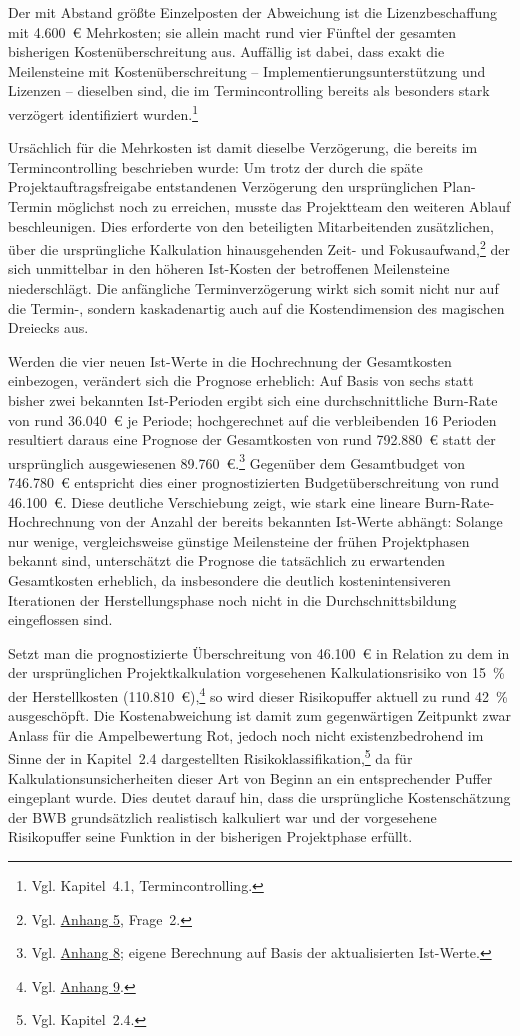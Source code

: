\documentclass[
    12pt, 
    a4paper,
    ]{scrartcl} %
\begin{document}
Der mit Abstand größte Einzelposten der Abweichung ist die Lizenzbeschaffung mit 4.600~€ Mehrkosten; sie allein macht rund vier Fünftel der gesamten bisherigen Kostenüberschreitung aus. Auffällig ist dabei, dass exakt die Meilensteine mit Kostenüberschreitung -- Implementierungsunterstützung und Lizenzen -- dieselben sind, die im Termincontrolling bereits als besonders stark verzögert identifiziert wurden.\footnote{Vgl. Kapitel~4.1, Termincontrolling.}

Ursächlich für die Mehrkosten ist damit dieselbe Verzögerung, die bereits im Termincontrolling beschrieben wurde: Um trotz der durch die späte Projektauftragsfreigabe entstandenen Verzögerung den ursprünglichen Plan-Termin möglichst noch zu erreichen, musste das Projektteam den weiteren Ablauf beschleunigen. Dies erforderte von den beteiligten Mitarbeitenden zusätzlichen, über die ursprüngliche Kalkulation hinausgehenden Zeit- und Fokusaufwand,\footnote{Vgl. \hyperref[sec:Anhang5]{Anhang 5}, Frage~2.} der sich unmittelbar in den höheren Ist-Kosten der betroffenen Meilensteine niederschlägt. Die anfängliche Terminverzögerung wirkt sich somit nicht nur auf die Termin-, sondern kaskadenartig auch auf die Kostendimension des magischen Dreiecks aus.

Werden die vier neuen Ist-Werte in die Hochrechnung der Gesamtkosten einbezogen, verändert sich die Prognose erheblich: Auf Basis von sechs statt bisher zwei bekannten Ist-Perioden ergibt sich eine durchschnittliche Burn-Rate von rund 36.040~€ je Periode; hochgerechnet auf die verbleibenden 16 Perioden resultiert daraus eine Prognose der Gesamtkosten von rund 792.880~€ statt der ursprünglich ausgewiesenen 89.760~€.\footnote{Vgl. \hyperref[sec:Anhang8]{Anhang 8}; eigene Berechnung auf Basis der aktualisierten Ist-Werte.} Gegenüber dem Gesamtbudget von 746.780~€ entspricht dies einer prognostizierten Budgetüberschreitung von rund 46.100~€. Diese deutliche Verschiebung zeigt, wie stark eine lineare Burn-Rate-Hochrechnung von der Anzahl der bereits bekannten Ist-Werte abhängt: Solange nur wenige, vergleichsweise günstige Meilensteine der frühen Projektphasen bekannt sind, unterschätzt die Prognose die tatsächlich zu erwartenden Gesamtkosten erheblich, da insbesondere die deutlich kostenintensiveren Iterationen der Herstellungsphase noch nicht in die Durchschnittsbildung eingeflossen sind.

Setzt man die prognostizierte Überschreitung von 46.100~€ in Relation zu dem in der ursprünglichen Projektkalkulation vorgesehenen Kalkulationsrisiko von 15~\% der Herstellkosten (110.810~€),\footnote{Vgl. \hyperref[sec:Anhang9]{Anhang 9}.} so wird dieser Risikopuffer aktuell zu rund 42~\% ausgeschöpft. Die Kostenabweichung ist damit zum gegenwärtigen Zeitpunkt zwar Anlass für die Ampelbewertung Rot, jedoch noch nicht existenzbedrohend im Sinne der in Kapitel~2.4 dargestellten Risikoklassifikation,\footnote{Vgl. Kapitel~2.4.} da für Kalkulationsunsicherheiten dieser Art von Beginn an ein entsprechender Puffer eingeplant wurde. Dies deutet darauf hin, dass die ursprüngliche Kostenschätzung der BWB grundsätzlich realistisch kalkuliert war und der vorgesehene Risikopuffer seine Funktion in der bisherigen Projektphase erfüllt.
\end{document}
